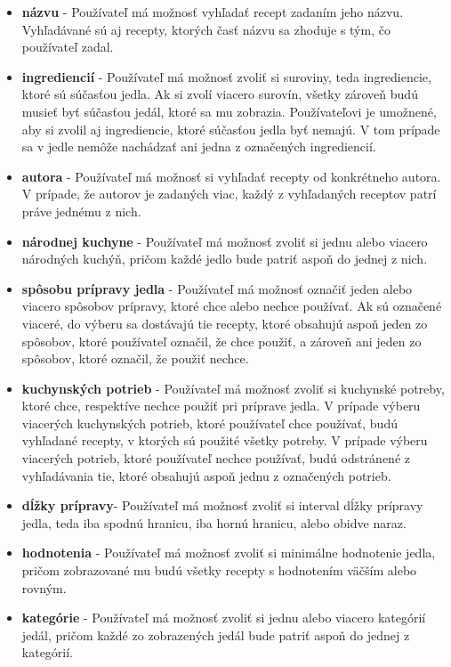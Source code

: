 \begin{enumerate}
\begin{itemize}
\item \textbf{názvu} - Používateľ má možnosť vyhľadať recept zadaním jeho názvu. Vyhľadávané sú aj recepty, ktorých časť názvu sa zhoduje s tým, čo používateľ zadal.
\item \textbf{ingrediencií} - Používateľ má možnosť zvoliť si suroviny, teda ingrediencie, ktoré sú súčasťou jedla. Ak si zvolí viacero surovín, všetky zároveň budú musieť byť súčasťou jedál, ktoré sa mu zobrazia. Používateľovi je  umožnené, aby si zvolil aj ingrediencie, ktoré súčasťou jedla byť nemajú. V tom prípade sa v jedle nemôže nachádzať ani jedna z označených ingrediencií.
\item \textbf{autora} - Používateľ má možnosť si vyhľadať recepty od konkrétneho autora. V prípade, že autorov je zadaných viac, každý z vyhľadaných receptov patrí práve jednému z nich.
\item \textbf{národnej kuchyne} - Používateľ má možnosť zvoliť si jednu alebo viacero národných kuchýň, pričom každé jedlo bude patriť aspoň do jednej z nich.
\item \textbf{spôsobu prípravy jedla} - Používateľ má možnosť označiť jeden alebo viacero spôsobov prípravy, ktoré chce alebo nechce používať. Ak sú označené viaceré, do výberu sa dostávajú tie recepty, ktoré obsahujú aspoň jeden zo spôsobov, ktoré používateľ označil, že chce použiť, a zároveň ani jeden zo spôsobov, ktoré označil, že použiť nechce.
\item \textbf{kuchynských potrieb} - Používateľ má možnosť zvoliť si kuchynské potreby, ktoré chce, respektíve nechce použiť pri príprave jedla. V prípade výberu viacerých kuchynských potrieb, ktoré používateľ chce používať, budú vyhľadané recepty, v ktorých sú použité všetky potreby. V prípade výberu viacerých potrieb, ktoré používateľ nechce používať, budú odstránené z vyhľadávania tie, ktoré obsahujú aspoň jednu z označených potrieb.
\item \textbf{dĺžky prípravy}- Používateľ má možnosť zvoliť si interval dĺžky prípravy jedla, teda iba spodnú hranicu, iba hornú hranicu, alebo obidve naraz. 
\item \textbf{hodnotenia} - Používateľ má možnosť zvoliť si minimálne hodnotenie jedla, pričom zobrazované mu budú všetky recepty s hodnotením väčším alebo rovným.
\item \textbf{kategórie} - Používateľ má možnosť zvoliť si jednu alebo viacero kategórií jedál, pričom každé zo zobrazených jedál bude patriť aspoň do jednej z kategórií.
\end{itemize}


\end{enumerate}
